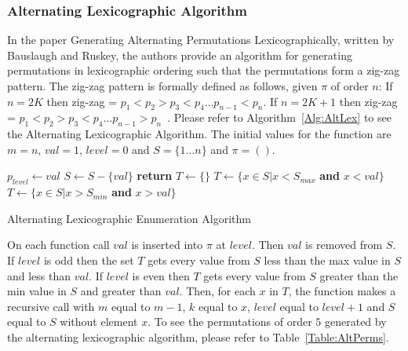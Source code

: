 \subsubsection{Alternating Lexicographic Algorithm}
In the paper Generating Alternating Permutations Lexicographically, written by Bauslaugh and Ruskey, the authors provide an algorithm 
for generating permutations in lexicographic ordering such that the permutations form a zig-zag pattern. 
The zig-zag pattern is formally defined as follows, given $\pi$ of order $n$:  If $n = 2K$ then 
zig-zag = $p_{1} < p_{2} > p_{3} < p_{4} \dots p_{n-1} < p_{n}$. 
If $n= 2K+1$ then zig-zag = $p_{1} < p_{2} > p_{3} < p_{4} \dots p_{n-1} > p_{n}$~\cite{A19}.
Please refer to Algorithm~\ref{Alg:AltLex} to see the Alternating Lexicographic Algorithm.
The initial values for the function are $m=n$, $val=1$, $level=0$ and $S = \{1 \dots n\}$ and $\pi=()$.


\begin{algorithm}
    \begin{algorithmic}[1]
            \State $p_{level} \gets val$
            \State $S \gets S-\{val\}$
                \State \textbf{return}
            \EndIf
            \State $T \gets \{\}$
                \State $T \gets \{x \in S | x < S_{max}$ \textbf{and} $x < val\}$
            \Else 
                \State $T \gets \{x \in S | x > S_{min}$ \textbf{and} $x > val\}$
            \EndIf
            \EndFor
        \EndFunction
        
    \end{algorithmic}
    \caption{Alternating Lexicographic Enumeration Algorithm}
    \label{Alg:AltLex}
\end{algorithm}


On each function call $val$ is inserted into $\pi$ at $level$. Then $val$ is removed from $S$.
If $level$ is odd then the set $T$ gets every value from $S$ less than the max value in $S$ and 
less than $val$. If  $level$ is even then $T$ gets every value from $S$ greater than  the min value 
in $S$ and greater than $val$. Then, for each $x$ in $T$, the function makes a recursive call 
with $m$ equal to $m-1$, $k$ equal to $x$, $level$ equal to $level+1$ and $S$ equal to $S$ without 
element $x$. To see the permutations of order $5$ generated by the alternating lexicographic algorithm, 
please refer to Table~\ref{Table:AltPerms}.

